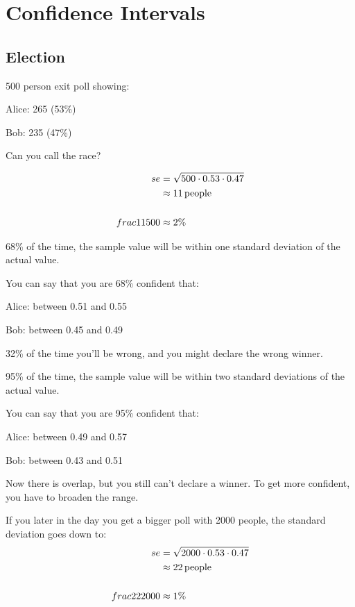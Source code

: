 \documentclass[letterpaper, landscape]{exam}
\begin{document}
  \section{Confidence Intervals}

  \subsection{Election}

  500 person exit poll showing:
  \begin{itemize*}
    \item Alice: 265 (53\%)
    \item Bob: 235 (47\%)
  \end{itemize*}

  Can you call the race?

  \begin{align*}
    se & = \sqrt{500 \cdot 0.53 \cdot 0.47} \\
       & \approx \unit[11]{people} \\
       \\
    frac{11}{500} &\approx 2\%
  \end{align*}

  68\% of the time, the sample value will be within one standard deviation of
  the actual value. 
  
  You can say that you are 68\% confident that:
  \begin{itemize*}
    \item Alice: between 0.51 and 0.55
    \item Bob: between 0.45 and 0.49
  \end{itemize*}

  32\% of the time you'll be wrong, and you might declare the wrong winner.

  95\% of the time, the sample value will be within two standard deviations of
  the actual value. 
  
  You can say that you are 95\% confident that:
  \begin{itemize*}
    \item Alice: between 0.49 and 0.57
    \item Bob: between 0.43 and 0.51
  \end{itemize*}

  Now there is overlap, but you still can't declare a winner. To get more
  confident, you have to broaden the range.

  If you later in the day you get a bigger poll with 2000 people, the standard
  deviation goes down to:
  \begin{align*}
    se & = \sqrt{2000 \cdot 0.53 \cdot 0.47} \\
       & \approx \unit[22]{people} \\
       \\
    frac{22}{2000} &\approx 1\%
  \end{align*}
\end{document}
